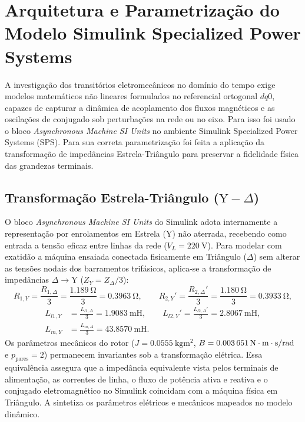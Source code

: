 \section{Arquitetura e Parametrização do Modelo Simulink Specialized Power Systems}\label{sec:modelo_Simulink}

A investigação dos transitórios eletromecânicos no domínio do tempo exige modelos matemáticos não lineares formulados no referencial ortogonal $dq0$, capazes de capturar a dinâmica de acoplamento dos fluxos magnéticos e as oscilações de conjugado sob perturbações na rede ou no eixo. Para isso foi usado o bloco \textit{Asynchronous Machine SI Units} no ambiente Simulink Specialized Power Systems (SPS). Para sua correta parametrização  foi feita a aplicação da transformação de impedâncias Estrela-Triângulo para preservar a fidelidade física das grandezas terminais.

\subsection{Transformação Estrela-Triângulo ($\text{Y}-\Delta$)}\label{subsec:mapeamento_ydelta}

O bloco \textit{Asynchronous Machine SI Units} do Simulink adota internamente a representação por enrolamentos em Estrela ($\text{Y}$) não aterrada, recebendo como entrada a tensão eficaz entre linhas da rede ($V_L = \SI{220}{\volt}$). Para modelar com exatidão a máquina ensaiada conectada fisicamente em Triângulo ($\Delta$) sem alterar as tensões nodais dos barramentos trifásicos, aplica-se a transformação de impedâncias $\Delta \to \text{Y}$ ($Z_Y = Z_\Delta / 3$):
\begin{equation}
R_{1,Y} = \frac{R_{1,\Delta}}{3} = \frac{\SI{1,189}{\ohm}}{3} = \SI{0,3963}{\ohm}, \qquad R_{2,Y}' = \frac{R_{2,\Delta}'}{3} = \frac{\SI{1,180}{\ohm}}{3} = \SI{0,3933}{\ohm},
\label{eq:resistencias_estrela}
\end{equation}
\begin{align}
L_{l1,Y} &= \frac{L_{l1,\Delta}}{3} = \SI{1,9083}{\milli\henry}, \qquad L_{l2,Y}' = \frac{L_{l2,\Delta}'}{3} = \SI{2,8067}{\milli\henry}, \nonumber \\
L_{m,Y} &= \frac{L_{m,\Delta}}{3} = \SI{43,8570}{\milli\henry}.
\label{eq:indutancias_estrela}
\end{align}
Os parâmetros mecânicos do rotor ($J = \SI{0,0555}{\kilogram\meter\squared}$, $B = \SI{0,003651}{\mathrm{N\cdot m}\cdot\second/\radian}$ e $p_{\text{pares}} = 2$) permanecem invariantes sob a transformação elétrica. Essa equivalência assegura que a impedância equivalente vista pelos terminais de alimentação, as correntes de linha, o fluxo de potência ativa e reativa e o conjugado eletromagnético no Simulink coincidam com a máquina física em Triângulo. A  sintetiza os parâmetros elétricos e mecânicos mapeados no modelo dinâmico.

